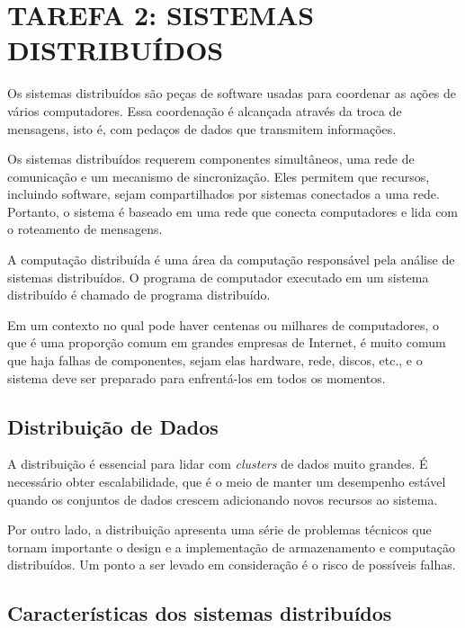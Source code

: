 
\chapter{TAREFA 2: SISTEMAS DISTRIBUÍDOS}
\label{sec:tarefa2}

Os sistemas distribuídos são peças de software usadas para coordenar as ações de vários computadores. Essa coordenação é alcançada através da troca de mensagens, isto é, com pedaços de dados que transmitem informações.

Os sistemas distribuídos requerem componentes simultâneos, uma rede de comunicação e um mecanismo de sincronização. Eles permitem que recursos, incluindo software, sejam compartilhados por sistemas conectados a uma rede. Portanto, o sistema é baseado em uma rede que conecta computadores e lida com o roteamento de mensagens.

A computação distribuída é uma área da computação responsável pela análise de sistemas distribuídos. O programa de computador executado em um sistema distribuído é chamado de programa distribuído.

Em um contexto no qual pode haver centenas ou milhares de computadores, o que é uma proporção comum em grandes empresas de Internet, é muito comum que haja falhas de componentes, sejam elas hardware, rede, discos, etc., e o sistema deve ser preparado para enfrentá-los em todos os momentos.

\section{Distribuição de Dados}
\label{distribuicao}

A distribuição é essencial para lidar com \textit{clusters} de dados muito grandes. É necessário obter escalabilidade, que é o meio de manter um desempenho estável quando os conjuntos de dados crescem adicionando novos recursos ao sistema.

Por outro lado, a distribuição apresenta uma série de problemas técnicos que tornam importante o design e a implementação de armazenamento e computação distribuídos. Um ponto a ser levado em consideração é o risco de possíveis falhas.


\section{Características dos sistemas distribuídos}
\label{caracteristica}

